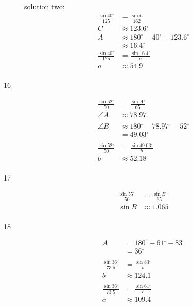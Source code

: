 \documentclass{exam}
\newcommand{\dg}{\ensuremath{^\circ}}
\begin{document}
\begin{description}
        solution two:
        \begin{align*}
          \frac{\sin 40 \dg}{125} & = \frac{\sin C}{162} \\
          C                       & \approx \boxed{ 123.6 } \dg \\
          A                       & \approx 180 \dg - 40 \dg - 123.6 \dg \\
                                  & \approx \boxed{ 16.4 } \dg
          \\
          \frac{\sin 40 \dg}{125} & = \frac{\sin 16.4 \dg}{a} \\
          a                       & \approx \boxed{ 54.9 } \\
        \end{align*}

      \item[16]
        \begin{align*}
          \frac{\sin 52 \dg}{50} & = \frac{\sin A \dg}{65} \\
          \angle A               & \approx \boxed{ 78.97 \dg } \\
          \\
          \angle B & \approx 180 \dg - 78.97 \dg - 52 \dg \\
                   & = \boxed{ 49.03 \dg } \\
          \\
          \frac{\sin 52 \dg}{50} & = \frac{\sin 49.03 \dg}{b} \\
          b                      & \approx \boxed{ 52.18 } \\
        \end{align*}

      \item[17]
        \begin{align*}
          \frac{\sin 55 \dg}{50} &= \frac{\sin B}{65} \\
          \sin B &\approx 1.065 \\
        \end{align*}


      \item[18]
        \begin{align*}
          A & = 180 \dg - 61 \dg - 83 \dg \\
            & = 36 \dg \\
          \\
          \frac{\sin 36 \dg}{73.5} & = \frac{\sin 83 \dg}{b} \\
          b                        & \approx \boxed{ 124.1 } \\
          \\
          \frac{\sin 36 \dg}{73.5} & = \frac{\sin 61 \dg}{c} \\
          c                        & \approx \boxed{ 109.4 } \\
        \end{align*}


\end{description}
\end{document}

